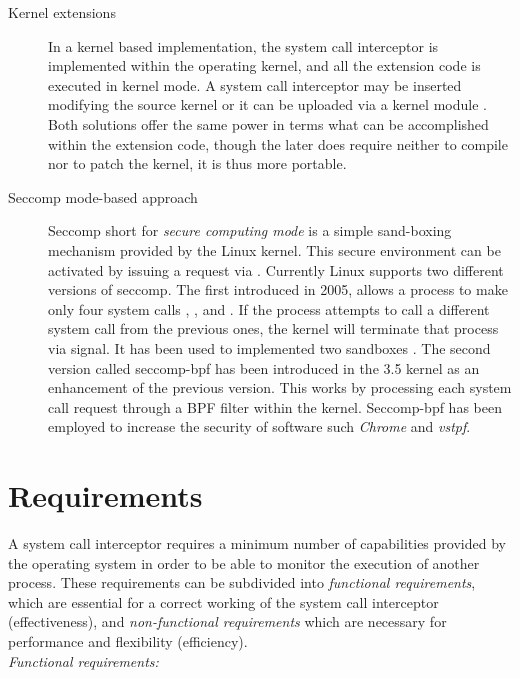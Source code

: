 \begin{description}
  
\item[Kernel extensions]In a kernel based implementation, the system call interceptor is implemented within the operating kernel, and all the extension code is executed in kernel mode. A system call interceptor may be inserted modifying the source kernel \cite{Noordende_asecure} or it can be uploaded via a kernel module \cite{Janus}. Both solutions offer the same power in terms what can be accomplished within the extension code, though the later does require neither to compile nor to patch the kernel, it is thus more portable. 

\item[Seccomp mode-based approach] Seccomp short for \textit{secure computing mode}  is a simple sand-boxing mechanism provided by the Linux kernel. This secure environment can be activated by issuing a request via . Currently Linux supports two different versions of seccomp. The first introduced in 2005, allows  a process to make only four system calls   ,  ,   and  . If the process attempts to call a different system call from the previous ones, the kernel will terminate that process via  signal. It has been used to implemented two sandboxes \cite{seccompsandbox, nurse}. The second version called seccomp-bpf has been introduced in the 3.5 kernel as an enhancement of the previous version. This works by processing each system call request through a BPF filter within the kernel. Seccomp-bpf has been employed to increase the security of software such \emph{Chrome} and \emph{vstpf}.


\end{description}


\section{Requirements}

A system call interceptor requires a minimum number of capabilities provided by the operating system in order to be able to monitor the execution of another process. These requirements can be subdivided into \textit{functional requirements}, which are essential for a correct working of the system call interceptor (effectiveness), and \textit{non-functional requirements} which are necessary for  performance and flexibility (efficiency). \\

{\setlength{\parindent}{0cm}
\textit{Functional requirements:} 
}

